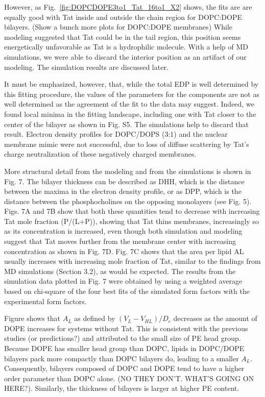 However, as Fig.~\ref{fig:DOPCDOPE3to1_Tat_16to1_X2} shows, the fits are are 
equally good with Tat inside and outside the chain region for DOPC:DOPE bilayers.
(Show a bunch more plots for DOPC:DOPE membranes) 
While modeling suggested
that Tat could be in the tail region, this position seems energetically 
unfavorable as Tat is a hydrophilic molecule. With a help of MD simulations,
we were able to discard the interior position as an artifact of our 
modeling. The simulation results are discussed later.

It
must be emphasized, however, that, while the total EDP is well determined by 
this fitting
procedure, the values of the parameters for the components are not as well 
determined as the agreement of the fit to the data may suggest. 
Indeed, we found local
minima in the fitting landscape, including one with Tat closer to the center 
of the bilayer as
shown in Fig. S5. The simulations help to discard that result. 
Electron density profiles for DOPC/DOPS (3:1) and the nuclear membrane 
mimic were not
successful, due to loss of diffuse scattering by Tat’s charge neutralization 
of these negatively
charged membranes.

More structural detail from the modeling and from the simulations is shown 
in Fig. 7. The
bilayer thickness can be described as DHH, which is the distance between 
the maxima in the
electron density profile, or as DPP, which is the distance between the 
phosphocholines on the
opposing monolayers (see Fig. 5). Figs. 7A and 7B show that both these 
quantities tend to
decrease with increasing Tat mole fraction (P/(L+P)), showing that Tat thins 
membranes,
increasingly so as its concentration is increased, even though both simulation 
and modeling
suggest that Tat moves further from the membrane center with increasing 
concentration as
shown in Fig. 7D. Fig. 7C shows that the area per lipid AL usually increases 
with increasing
mole fraction of Tat, similar to the findings from MD simulations (Section 3.2), 
as would be
expected. The results from the simulation data plotted in Fig. 7 were obtained 
by using a
weighted average based on chi-square of the four best fits of the simulated 
form factors with the
experimental form factors.

Figure shows that $A_L$ as defined by $(V_L-V_{HL})/D_c$ decreases as the 
amount of DOPE increases for systems without Tat. This is consistent with the
previous studies (or predictions?) and attributed to the small size of PE
head group. Because DOPE has smaller head group than DOPC, lipids in DOPC/DOPE
bilayers pack more compactly than DOPC bilayers do, leading to a smaller $A_L$.
Consequently, bilayers composed of DOPC and DOPE tend to have a higher order 
parameter than DOPC alone. (NO THEY DON'T. WHAT'S GOING ON HERE?). Similarly,
the thickness of bilayers is larger at higher PE content. 

